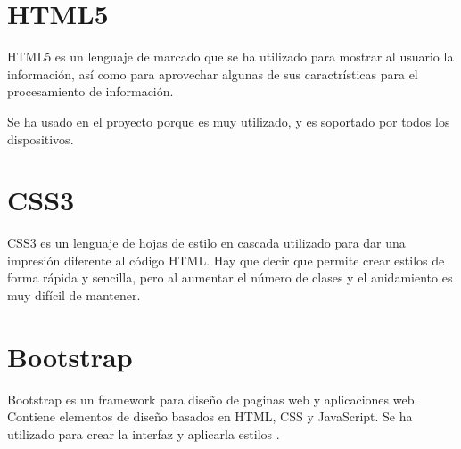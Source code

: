 \section{HTML5}\label{HTML5}

HTML5 es un lenguaje de marcado que se ha utilizado para mostrar al usuario la información, así como para aprovechar algunas de sus caractrísticas para el procesamiento de información.

Se ha usado en el proyecto porque es muy utilizado, y es soportado por todos los dispositivos.

\section{CSS3}\label{CSS3}

CSS3 es un lenguaje de hojas de estilo en cascada utilizado para dar una impresión diferente al código HTML. Hay que decir que permite crear estilos de forma rápida y sencilla, pero al aumentar el número de clases y el anidamiento es muy difícil de mantener. 
 
\section{Bootstrap}\label{bootstrap}

Bootstrap es un framework para diseño de paginas web y aplicaciones web. Contiene elementos de diseño basados en HTML, CSS y JavaScript. Se ha utilizado para crear la interfaz y aplicarla estilos \cite{bootstrapbib}. 

